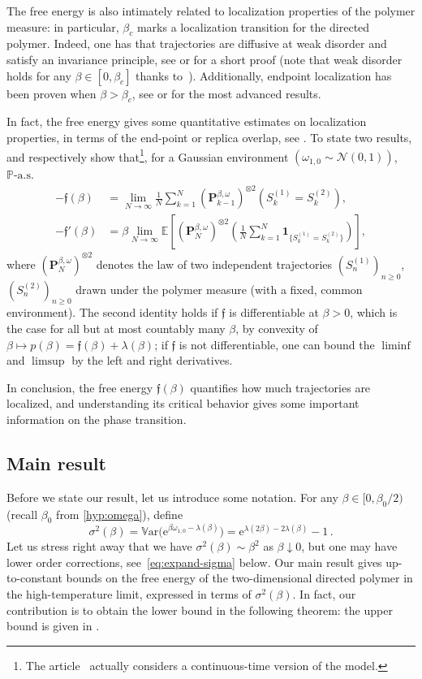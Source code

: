 \documentclass[11pt]{amsart}
\numberwithin{equation}{section}
\newcommand*{\EE}{\mathbb{E}}
\newcommand*{\PP}{\mathbb{P}}
\newcommand*{\bP}{\mathbf{P}}
\newcommand*{\ind}{\mathbf{1}}
\newcommand{\e}{\mathrm{e}}
\newcommand*{\tf}{\mathfrak{f}}
\newcommand*{\Var}{\mathbb{V}\mathrm{ar}}
\theoremstyle{plain}
\theoremstyle{definition}
\theoremstyle{remark}
\begin{document}
The free energy is also intimately related to localization properties of the polymer measure: in particular,  \(\beta_c\) marks a localization transition for the directed polymer.
Indeed, one has that trajectories are diffusive at weak disorder and satisfy an invariance principle, see \cite{CY06} or \cite{Lac25-ecp} for a short proof (note that weak disorder holds for any \(\beta \in [0,\beta_c]\) thanks to~\cite{JL24a}). 
Additionally, endpoint localization has been proven when \(\beta>\beta_c\), see \cite{CSY03} or \cite{BC20} for the most advanced results.

In fact, the free energy gives some quantitative estimates on localization properties, in terms of the end-point or replica overlap, see \cite{CH02,CH06,CSY03}. 
To state two results, \cite{CH06} and \cite{CH02} respectively show that\footnote{The article~\cite{CH06} actually considers a continuous-time version of the model.}, for a Gaussian environment \((\omega_{1,0}\sim \mathcal{N}(0,1))\),  $\PP\text{-a.s.}$
\begin{align*}
- \tf(\beta)
&=
\lim_{N\to\infty}\frac1N\sum_{k=1}^N
(\bP_{k-1}^{\beta,\omega})^{\otimes 2}
\left(S_k^{(1)}=S_k^{(2)}\right), 
\\ 
-\tf'(\beta)& = \beta \lim_{N\to\infty}
\EE\left[(\bP_N^{\beta,\omega})^{\otimes 2}\left(\frac1N\sum_{k=1}^N \ind_{\{S_k^{(1)}=S_k^{(2)}\}}\right)\right],
\end{align*}
where \((\bP_N^{\beta,\omega})^{\otimes 2}\) denotes the law of two independent trajectories \((S_n^{(1)})_{n\geq 0}\), \((S_n^{(2)})_{n\geq 0}\) drawn under the polymer measure (with a fixed, common environment).
The second identity holds if \(\tf\) is differentiable at \(\beta>0\), which is the case for all but at most countably many \(\beta\), by convexity of \(\beta\mapsto p(\beta) = \tf(\beta) +\lambda(\beta)\); if \(\tf\) is not differentiable, one can bound the \(\liminf\) and \(\limsup\) by the left and right derivatives.

In conclusion, the free energy \(\tf(\beta)\) quantifies how much trajectories are localized, and understanding its critical behavior gives some important information on the phase transition.



\subsection{Main result}

Before we state our result, let us introduce some notation.
For any \(\beta \in [0,\beta_0/2)\) (recall $\beta_0$ from \eqref{hyp:omega}), define
\[
\sigma^2(\beta) =\Var\Big(\e^{\beta \omega_{1,0} -\lambda(\beta)}\Big) = \e^{\lambda(2\beta) -2\lambda(\beta)}-1 \,.
\]
Let us stress right away that we have \(\sigma^2(\beta)\sim \beta^2\) as \(\beta\downarrow 0\), but one may have lower order corrections, see~\eqref{eq:expand-sigma} below.
Our main result gives up-to-constant bounds on the free energy of the two-dimensional directed polymer in the high-temperature limit, expressed in terms of \(\sigma^{2}(\beta)\).
In fact, our contribution is to obtain the lower bound in the following theorem: the upper bound is given in \cite[Theorem~2.8]{BCT25}.
\end{document}
